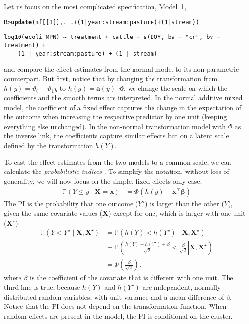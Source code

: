\documentclass[11pt]{article}\usepackage[]{graphicx}\usepackage{xcolor}
\makeatletter
\newcommand{\hlnum}[1]{\textcolor[rgb]{0.686,0.059,0.569}{#1}}%
\newcommand{\hlopt}[1]{\textcolor[rgb]{0,0,0}{#1}}%
\newcommand{\hlstd}[1]{\textcolor[rgb]{0.345,0.345,0.345}{#1}}%
\newcommand{\hlkwd}[1]{\textcolor[rgb]{0.737,0.353,0.396}{\textbf{#1}}}%
\newenvironment{kframe}{%
 \def\at@end@of@kframe{}%
 \ifinner\ifhmode%
  \def\at@end@of@kframe{\end{minipage}}%
  \begin{minipage}{\columnwidth}%
 \fi\fi%
 \def\FrameCommand##1{\hskip\@totalleftmargin \hskip-\fboxsep
 \colorbox{shadecolor}{##1}\hskip-\fboxsep
     \hskip-\linewidth \hskip-\@totalleftmargin \hskip\columnwidth}%
 \MakeFramed {\advance\hsize-\width
   \@totalleftmargin\z@ \linewidth\hsize
   \@setminipage}}%
 {\par\unskip\endMakeFramed%
 \at@end@of@kframe}
\newenvironment{knitrout}{}{} %
\newcommand{\IP}{{\mathbb{P}}}
\newcommand{\X}{{\boldsymbol{X}}}
\newcommand{\x}{{\boldsymbol{x}}}
\newcommand{\bbeta}{{\boldsymbol{\beta}}}
\newcommand{\bvartheta}{{\boldsymbol{\vartheta}}}
\newcommand{\0}{{\mathbf{0}}}
\renewcommand{\a}{{\mathbf{a}}}
\newcommand{\T}{^{\top}}
\makeatother
\begin{document}
Let us focus on the most complicated specification, Model~1,
%
\begin{knitrout}\small
{}\color{fgcolor}\begin{kframe}
\begin{alltt}
\hlstd{R> }\hlkwd{update}\hlstd{(mf[[}\hlnum{1}\hlstd{]], .} \hlopt{~} \hlstd{.} \hlopt{+} \hlstd{(}\hlnum{1} \hlopt{|} \hlstd{year}\hlopt{:}\hlstd{stream}\hlopt{:}\hlstd{pasture)} \hlopt{+} \hlstd{(}\hlnum{1} \hlopt{|} \hlstd{stream))}
\end{alltt}
\begin{verbatim}
log10(ecoli_MPN) ~ treatment + cattle + s(DOY, bs = "cr", by = treatment) + 
    (1 | year:stream:pasture) + (1 | stream)
\end{verbatim}
\end{kframe}
\end{knitrout}
%
\noindent
and compare the effect estimates from the normal model to
its non-parametric counterpart.
But first, notice that by changing the transformation from
$h(y) = \vartheta_{0} + \vartheta_{1}y$ to
$h(y) = \a(y)\T\bvartheta$,
we change the scale on which the coefficients
and the smooth terms are interpreted.
In the normal additive mixed model,
the coefficient of a fixed effect captures
the change in the expectation of the outcome when increasing
the respective predictor by one unit
(keeping everything else unchanged).
In the non-normal transformation model with
$\Phi$ as the inverse link, the coefficients
capture similar effects but on a latent scale
defined by the transformation $h(Y)$.

To cast the effect estimates from the two models to a common scale,
we can calculate the \emph{probabilistic indices} \citep[PI,][]{Thas_2012}.
To simplify the notation,
without loss of generality,
we will now focus on the simple, fixed effects-only case:
%
\begin{align*}
  \IP(Y\leq y \mid \X = \x) &= \Phi\left(h(y) - \x\T\bbeta \right)
\end{align*}
%
The PI is the probability that
one outcome ($Y^{\star}$) is larger than the other ($Y$),
given the same covariate values ($\X$) except for one,
which is larger with one unit ($\X^{\star}$)
%
\begin{align*}
  \IP\left(Y < Y^{\star} \mid \X, \X^{\star}\right)
  &= \IP\left(h(Y) < h(Y^{\star}) \mid \X, \X^{\star}\right) \\
  &= \IP\left(\left.\frac{h(Y) - h(Y^{\star}) + \beta}{\sqrt{2}} < \frac{\beta}{\sqrt{2}}
    \right| \X, \X^{\star}\right) \\
  &= \Phi\left(\frac{\beta}{\sqrt{2}}\right),
\end{align*}
%
where $\beta$ is the coefficient
of the covariate that is different with one unit.
The third line is true, because $h(Y)$ and $h(Y^{\star})$
are independent, normally distributed random variables,
with unit variance and a mean difference of $\beta$.
Notice that the PI does not depend on the transformation function.
When random effects are present in the model,
the PI is conditional on the cluster.
\end{document}
